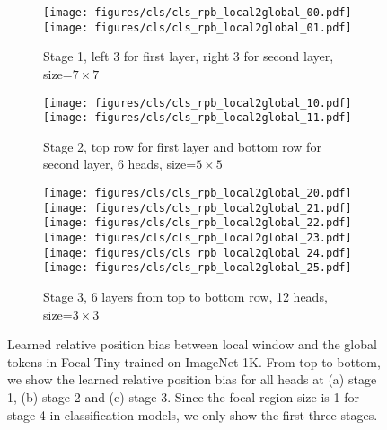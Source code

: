 \documentclass{article}
\begin{document}
\begin{figure}[t]
\begin{subfigure}{\textwidth}
  \texttt{[image: figures/cls/cls\_rpb\_local2global\_00.pdf]}
  \texttt{[image: figures/cls/cls\_rpb\_local2global\_01.pdf]}  
  \caption{Stage 1, left 3 for first layer, right 3 for second layer, size=$7\times 7$}
\end{subfigure}
\begin{subfigure}{\textwidth}
  \texttt{[image: figures/cls/cls\_rpb\_local2global\_10.pdf]}
  \texttt{[image: figures/cls/cls\_rpb\_local2global\_11.pdf]}  
\caption{Stage 2, top row for first layer and bottom row for second layer, 6 heads, size=$5\times 5$}
\end{subfigure}
\begin{subfigure}{\textwidth}
  \texttt{[image: figures/cls/cls\_rpb\_local2global\_20.pdf]}
  \texttt{[image: figures/cls/cls\_rpb\_local2global\_21.pdf]}    
  \texttt{[image: figures/cls/cls\_rpb\_local2global\_22.pdf]}    
  \texttt{[image: figures/cls/cls\_rpb\_local2global\_23.pdf]}    
  \texttt{[image: figures/cls/cls\_rpb\_local2global\_24.pdf]}    
  \texttt{[image: figures/cls/cls\_rpb\_local2global\_25.pdf]}      
\caption{Stage 3, 6 layers from top to bottom row, 12 heads, size=$3\times 3$}
\end{subfigure}
  \caption{Learned relative position bias between local window and the global tokens in Focal-Tiny trained on ImageNet-1K. From top to bottom, we show the learned relative position bias for all heads at (a) stage 1, (b) stage 2 and (c) stage 3. Since the focal region size is 1 for stage 4 in classification models, we only show the first three stages.}
  \label{fig:local2global_rpb_imagenet}
\end{figure}
\end{document}
